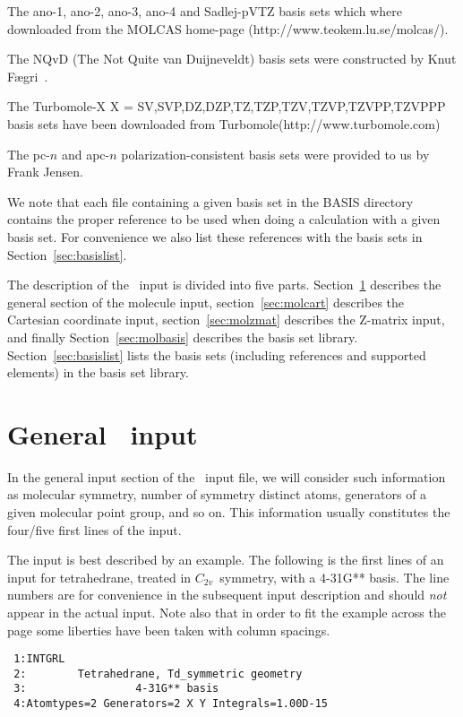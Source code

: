 \begin{list}{--}{}
\item The ano-1, ano-2, ano-3, ano-4 and Sadlej-pVTZ basis sets which where
downloaded from the MOLCAS home-page
(http://www.teokem.lu.se/molcas/).
\item The NQvD (The Not Quite van Duijneveldt) basis sets were constructed
by Knut F\ae gri~\cite{nqvdref}.
\item The Turbomole-X {X = SV,SVP,DZ,DZP,TZ,TZP,TZV,TZVP,TZVPP,TZVPPP} basis sets have
been downloaded from Turbomole(http://www.turbomole.com)
\item The pc-$n$ and apc-$n$ polarization-consistent basis sets were provided to us by Frank Jensen.
\end{list}

We note that each file containing a given basis set in the BASIS
directory contains the proper reference to be used when doing a 
calculation with a given basis set. For convenience we also list 
these references with the basis sets in Section~\ref{sec:basislist}.

The description of the \mol\ input is divided into five parts.
Section~\ref{sec:molgeneral} describes the general section of the
molecule input,
section~\ref{sec:molcart} describes the Cartesian coordinate
input,
section~\ref{sec:molzmat} describes the Z-matrix
input, and finally
Section~\ref{sec:molbasis} describes the basis set
library.
Section~\ref{sec:basislist} lists the basis sets (including references and supported elements) 
in the basis set library.

\section{General \mol\ input}\label{sec:molgeneral}

In the general input section of the \mol\ input file, we will consider
such information as molecular symmetry, number of
symmetry distinct atoms, generators of a
given molecular point group, and so on.
This information usually constitutes the four/five first lines of the
input.

The input is best described by an example.
The following is the first lines of an input for
tetrahedrane, treated in
$C_{2v}$~symmetry, with a 4-31G** basis.  The line numbers are for
convenience in the subsequent input description and should {\em
not} appear in the actual input.  Note also that in order to fit
the example across the page some liberties have been taken with
column spacings.
\begin{verbatim}
 1:INTGRL
 2:        Tetrahedrane, Td_symmetric geometry
 3:                 4-31G** basis
 4:Atomtypes=2 Generators=2 X Y Integrals=1.00D-15
\end{verbatim}

